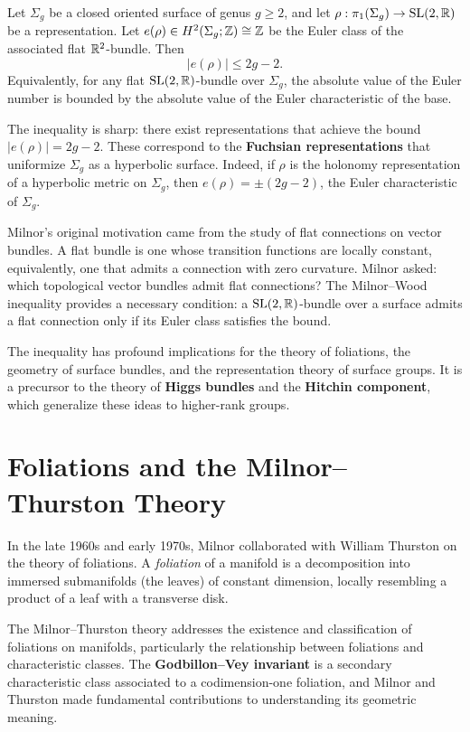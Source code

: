 \begin{theorem}
Let \(\Sigma_g\) be a closed oriented surface of genus \(g \geq 2\), and let \(\rho: \pi_1(\Sigma_g) \to \operatorname{SL}(2,\mathbb{R})\) be a representation. Let \(e(\rho) \in H^2(\Sigma_g; \mathbb{Z}) \cong \mathbb{Z}\) be the Euler class of the associated flat \(\mathbb{R}^2\)-bundle. Then
\[
|e(\rho)| \leq 2g - 2.
\]
Equivalently, for any flat \(\operatorname{SL}(2,\mathbb{R})\)-bundle over \(\Sigma_g\), the absolute value of the Euler number is bounded by the absolute value of the Euler characteristic of the base.
\end{theorem}

The inequality is sharp: there exist representations that achieve the bound \(|e(\rho)| = 2g - 2\). These correspond to the \textbf{Fuchsian representations} that uniformize \(\Sigma_g\) as a hyperbolic surface. Indeed, if \(\rho\) is the holonomy representation of a hyperbolic metric on \(\Sigma_g\), then \(e(\rho) = \pm (2g - 2)\), the Euler characteristic of \(\Sigma_g\).

Milnor's original motivation came from the study of flat connections on vector bundles. A flat bundle is one whose transition functions are locally constant, equivalently, one that admits a connection with zero curvature. Milnor asked: which topological vector bundles admit flat connections? The Milnor--Wood inequality provides a necessary condition: a \(\operatorname{SL}(2,\mathbb{R})\)-bundle over a surface admits a flat connection only if its Euler class satisfies the bound.

The inequality has profound implications for the theory of foliations, the geometry of surface bundles, and the representation theory of surface groups. It is a precursor to the theory of \textbf{Higgs bundles} and the \textbf{Hitchin component}, which generalize these ideas to higher-rank groups.

\section{Foliations and the Milnor--Thurston Theory}

In the late 1960s and early 1970s, Milnor collaborated with William Thurston on the theory of foliations. A \textit{foliation} of a manifold is a decomposition into immersed submanifolds (the leaves) of constant dimension, locally resembling a product of a leaf with a transverse disk.

The Milnor--Thurston theory addresses the existence and classification of foliations on manifolds, particularly the relationship between foliations and characteristic classes. The \textbf{Godbillon--Vey invariant} is a secondary characteristic class associated to a codimension-one foliation, and Milnor and Thurston made fundamental contributions to understanding its geometric meaning.

